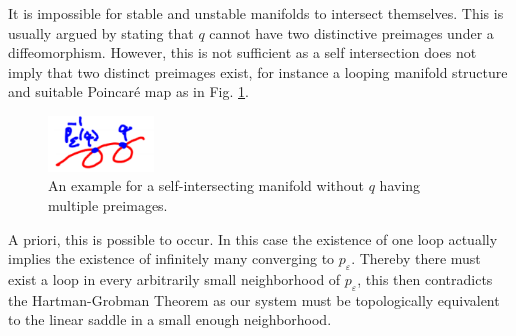 \begin{remark}[]
	It is impossible for stable and unstable manifolds to intersect themselves. This is usually argued by stating that $q$ cannot have two distinctive preimages under a diffeomorphism. However, this is not sufficient as a self intersection does not imply that two distinct preimages exist, for instance a looping manifold structure and suitable Poincaré map as in Fig. \ref{fig:loopdeloop}.
	\begin{figure}[h!]
		\centering
		\includegraphics[width=0.25\textwidth]{figures/ch6/12loopdeloop.png}
		\caption{An example for a self-intersecting manifold without $q$ having multiple preimages.}
		\label{fig:loopdeloop}
	\end{figure}
A priori, this is possible to occur. In this case the existence of one loop actually implies the existence of infinitely many converging to $p_{\varepsilon}$. Thereby there must exist a loop in every arbitrarily small neighborhood of $p_{\varepsilon}$, this then contradicts the Hartman-Grobman Theorem as our system must be topologically equivalent to the linear saddle in a small enough neighborhood. 	
\end{remark}

